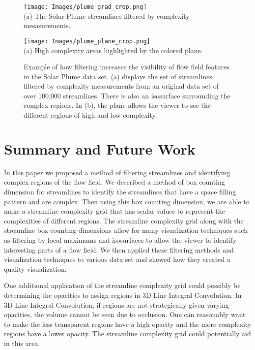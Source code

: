 \documentclass{egpubl}
\begin{document}
\begin{figure}[h]
        \centering
               	\begin{minipage}{0.47\linewidth}
                        \texttt{[image: Images/plume\_grad\_crop.png]}\\(a) The Solar Plume streamlines filtered by complexity mesasurements. \vspace{0.2em}
                \end{minipage}
                \begin{minipage}{0.47\linewidth}
                        \texttt{[image: Images/plume\_plane\_crop.png]}\\(a) High complexity areas highlighted by the colored plane. \vspace{0.2em}
                \end{minipage}
        \caption{Example of how filtering increases the visibility of flow field features in the Solar Plume data set. (a) displays the set of streamlines filtered by complexity measurements from an original data set of over 100,000 streamlines. There is also an isosurface surrounding the complex regions. In (b), the plane allows the viewer to see the different regions of high and low complexity.}
        \label{fig:plume_lines}
\end{figure}

\section{Summary and Future Work}

In this paper we proposed a method of filtering streamlines and identifying complex regions of the flow field.
We described a method of box counting dimension for streamlines to identify the streamlines that have a space filling pattern and are complex.
Then using this box counting dimension, we are able to make a streamline complexity grid that has scalar values to represent the complexities of different regions.
The streamline complexity grid along with the streamline box counting dimensions allow for many visualization techniques such as filtering by local maximums and isosurfaces to allow the viewer to identify interesting parts of a flow field.
We then applied these filtering methods and visualization techniques to various data set and showed how they created a quality visualization.

One additional application of the streamline complexity grid could possibly be determining the opacities to assign regions in 3D Line Integral Convolution.
In 3D Line Integral Convolution, if regions are not strategically given varying opacities, the volume cannot be seen due to occlusion.
One can reasonably want to make the less transparent regions have a high opacity and the more complexity regions have a lower opacity.
The streamline complexity grid could potentially aid in this area.


\clearpage
%


\end{document}
